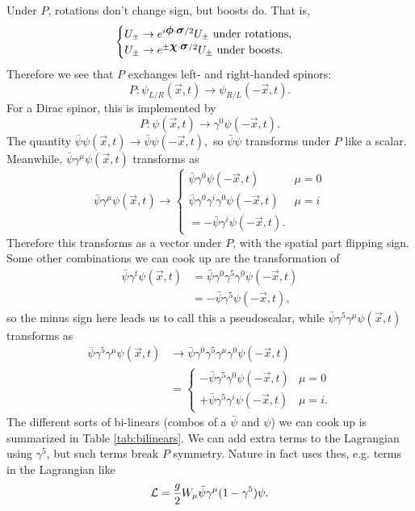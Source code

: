 Under $P$, rotations don't change sign, but boosts do. That is,
$$\begin{cases}
U_\pm \to e^{i\mbox{\boldmath$ \phi $} \cdot \mbox{\boldmath$ \sigma $}/2} U_\pm \text{ under rotations},\\
U_\pm \to e^{\pm\mbox{\boldmath$ \chi $} \cdot \mbox{\boldmath$ \sigma $}/2} U_\pm \text{ under boosts}.
\end{cases}$$
Therefore we see that $P$ exchanges left- and right-handed spinors:
$$P: \psi_{L/R}(\vec x,t)\to \psi_{R/L}(-\vec x, t).$$
For a Dirac spinor, this is implemented by
$$P:\psi(\vec x,t)\to \gamma^0 \psi(-\vec x,t).$$
The quantity $\bar \psi \psi(\vec x,t)\to \bar \psi \psi(-\vec x,t),$ so $\bar \psi \psi$ transforms under $P$ like a scalar. Meanwhile, $\bar \psi \gamma^\mu \psi(\vec x,t)$ transforms as
$$\bar \psi \gamma^\mu \psi(\vec x,t) \to\begin{cases}
\bar \psi \gamma^0 \psi(-\vec x,t) & \mu=0\\
\bar \psi \gamma^0 \gamma^i \gamma^0 \psi(-\vec x,t)& \mu = i\\ = -\bar \psi \gamma^i \psi(-\vec x,t).
\end{cases}$$
Therefore this transforms as a vector under $P$, with the spatial part flipping sign. Some other combinations we can cook up are the transformation of%
\begin{align*}
    \bar \psi \gamma^t \psi(\vec x,t)&=\bar \psi \gamma^0 \gamma^5 \gamma^0 \psi(-\vec x,t)\\
    &= -\bar \psi \gamma^5 \psi(-\vec x,t),
\end{align*}
so the minus sign here leads us to call this a pseudoscalar, while $\bar \psi \gamma^5 \gamma^\mu \psi(\vec x,t)$ transforms as
\begin{align*}
    \bar \psi \gamma^5 \gamma^\mu \psi(\vec x,t)
    &\to \bar \psi \gamma^0 \gamma^5 \gamma^\mu \gamma^0\psi(-\vec x,t)\\
    &=\begin{cases}
    -\bar\psi \gamma^5 \gamma^0 \psi(-\vec x,t) & \mu=0\\
    +\bar\psi \gamma^5 \gamma^i \psi(-\vec x,t) & \mu=i.
    \end{cases}
\end{align*}
The different sorts of bi-linears (combos of a $\bar \psi$ and $\psi$) we can cook up is summarized in Table \ref{tab:bilinears}. We can add extra terms to the Lagrangian using $\gamma^5$, but such terms break $P$ symmetry. Nature in fact uses thes, e.g. terms in the Lagrangian like
$$\mathcal L=\frac{g}{2}W_\mu \bar\psi \gamma^\mu(1-\gamma^5)\psi.$$

